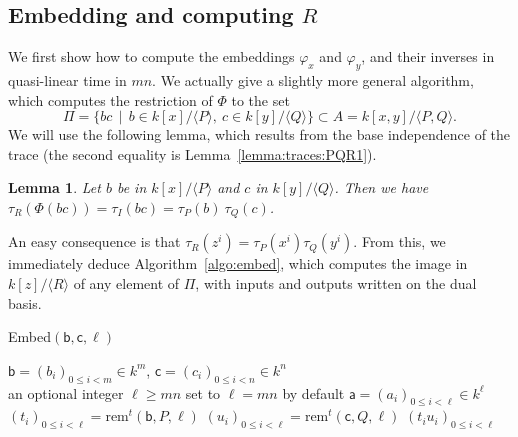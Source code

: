 \documentclass{sig-alternate}
\def\va {\ensuremath{\mathsf{a}}}
\def\vb {\ensuremath{\mathsf{b}}}
\def\vc {\ensuremath{\mathsf{c}}}
\def\rem {\ensuremath{\mathrm{rem}}}
\newcommand{\ang}[1]{\langle#1\rangle}
\newtheorem{Lemma}{Lemma}
\begin{document}

\subsection{Embedding and computing $R$} 

We first show how to compute the embeddings $\varphi_x$ and
$\varphi_y$, and their inverses in quasi-linear time in $mn$. We
actually give a slightly more general algorithm, which computes the
restriction of $\Phi$ to the set $$\Pi= \{bc \,\mid\, b\in
k[x]/\ang{P},\ c\in k[y]/\ang{Q}\} \subset A=k[x,y]/\ang{P,Q}.$$ We
will use the following lemma, which results from the base independence
of the trace (the second equality is Lemma~\ref{lemma:traces:PQR1}).
\begin{Lemma}
  \label{lemma:traces:PQR}
  Let $b$ be in $k[x]/\ang{P}$ and $c$ in $k[y]/\ang{Q}$. Then we have
  $\tau_R(\Phi(bc)) = \tau_I(bc) = \tau_P(b) \ \tau_Q(c)$.
\end{Lemma}
An easy consequence is that $\tau_R(z^i) =
\tau_P(x^i)\tau_Q(y^i)$. From this, we immediately deduce
Algorithm~\ref{algo:embed}, which computes the image in $k[z]/\ang{R}$
of any element of $\Pi$, with inputs and outputs written on the dual
basis.

\begin{algorithm}[H]
  \caption{Embed$(\vb,\vc,\ell)$}
  \begin{algorithmic}[1]
    \REQUIRE $\vb=(b_i)_{0 \le i < m} \in k^m$, $\vc=(c_i)_{0 \le i < n} \in k^n$\\
    an optional integer $\ell \ge mn$ set to $\ell=mn$ by default
    \ENSURE $\va=(a_i)_{0 \le i < \ell} \in k^{\ell}$
    \STATE $(t_i)_{0\le i<\ell} = \rem^t(\vb,P,\ell)$
    \STATE $(u_i)_{0\le i<\ell} = \rem^t(\vc,Q,\ell)$
    \RETURN $(t_i u_i)_{0 \le i <\ell}$
  \end{algorithmic}
  \label{algo:embed}
\end{algorithm}
\end{document}
